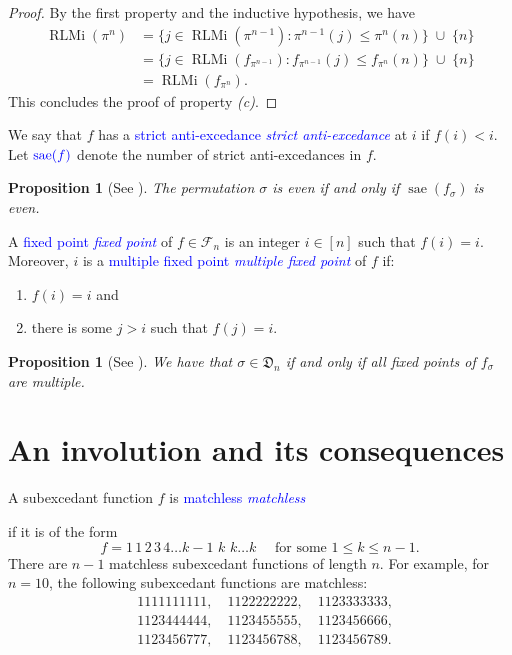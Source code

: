 \documentclass[reqno]{amsart}
\newtheorem{proposition}[theorem]{Proposition}
\theoremstyle{definition}
\newcommand{\defin}[1]{%
\relax\ifmmode%
\textcolor{blue}{#1}%
\else\textcolor{blue}{\emph{#1}}%
\fi%
}
\newcommand{\dArr}{\mathfrak{D}}
\newcommand{\SEF}{\mathcal{F}}  %
\DeclareMathOperator{\RLMi}{RLMi}
\DeclareMathOperator{\aexc}{sae} %
\begin{document}
\begin{proof}
\medskip 
By the first property and the inductive hypothesis,
we have
\begin{align*}
    \RLMi(\pi^n) &= \{j \in \RLMi(\pi^{n-1}) : \pi^{n-1}(j) \leq \pi^n(n) \} \; \cup \; \{n\} \\
    &=\{j \in \RLMi(f_{\pi^{n-1}}): f_{\pi^{n-1}}(j) \leq f_{\pi^n}(n)\} \; \cup \; \{n\}\\
    &=\RLMi(f_{\pi^n}).
\end{align*}
This concludes the proof of property \textit{(c)}.
\end{proof}


We say that $f$ has a \defin{strict anti-excedance} at $i$ if $f(i)<i$.
Let $\defin{\aexc(f)}$ denote the number of strict anti-excedances in $f$.
\begin{proposition}[{See \cite[Prop. 4.1]{MantaciRakotondrajao2001}}]\label{prop:evenSEF}
The permutation $\sigma$ is even if and only if $\aexc(f_{\sigma})$
is even.
\end{proposition}


A \defin{fixed point} of $f \in \SEF_n$ is an integer $i \in [n]$ such that $f(i)=i$.
Moreover, $i$ is a \defin{multiple fixed point} of $f$ if:
\begin{enumerate}
	\item $f(i)=i$ and 
	\item there is some $j>i$ such that $f(j)=i$.
\end{enumerate}

\begin{proposition}[{See \cite[Prop. 3.8]{MantaciRakotondrajao2001}}]\label{prop:derangmentSEF}
We have that $\sigma \in \dArr_n$ if and only if all
fixed points of $f_{\sigma}$ are multiple.
\end{proposition}





\section{An involution and its consequences}\label{sec:involution}


A subexcedant function $f$ is \defin{matchless}
if it is of the form
\[
f= 1\,1\,2\,3\,4\dotsc k{-}1\,\,k\,\,k\dotsc k \quad \text{  for some $1\leq k \leq n{-}1$}.
\]
There are $n-1$ matchless subexcedant functions of length $n$.
For example, for $n=10$, the following subexcedant functions are matchless:
\begin{align*}
 &1111111111, \quad 1122222222, \quad 1123333333, \\
 &1123444444, \quad 1123455555, \quad 1123456666, \\
 &1123456777, \quad 1123456788, \quad 1123456789. 
\end{align*}
\end{document}
